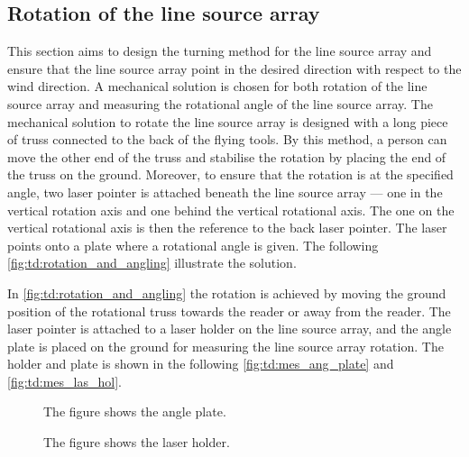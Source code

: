 \subsection{Rotation of the line source array}
This section aims to design the turning method for the line source array and ensure that the line source array point in the desired direction with respect to the wind direction. A mechanical solution is chosen for both rotation of the line source array and measuring the rotational angle of the line source array. The mechanical solution to rotate the line source array is designed with a long piece of truss connected to the back of the flying tools. By this method, a person can move the other end of the truss and stabilise the rotation by placing the end of the truss on the ground. Moreover, to ensure that the rotation is at the specified angle, two laser pointer is attached beneath the line source array — one in the vertical rotation axis and one behind the vertical rotational axis. The one on the vertical rotational axis is then the reference to the back laser pointer. The laser points onto a plate where a rotational angle is given. The following \autoref{fig:td:rotation_and_angling} illustrate the solution.


In \autoref{fig:td:rotation_and_angling} the rotation is achieved by moving the ground position of the rotational truss towards the reader or away from the reader. The laser pointer is attached to a laser holder on the line source array, and the angle plate is placed on the ground for measuring the line source array rotation. The holder and plate is shown in the following \autoref{fig:td:mes_ang_plate} and \autoref{fig:td:mes_las_hol}.


\begin{figure}[H]
    \centering
     \captionsetup{width=1\linewidth}
    \begin{minipage}{0.36\textwidth}
        \centering
         \captionsetup{width=0.90\linewidth}
       
        \caption{The figure shows the angle plate.}
        \label{fig:td:mes_ang_plate}
    \end{minipage}%
    \begin{minipage}{0.56\textwidth}
        \centering
         \captionsetup{width=0.90\linewidth}
        
        \caption{The figure shows the laser holder.}
        \label{fig:td:mes_las_hol}
    \end{minipage}
\end{figure}


